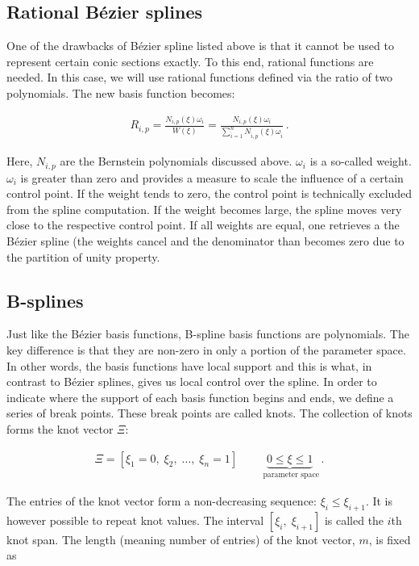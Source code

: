 \documentclass[11pt,a4paper]{article}
\begin{document}
\subsection{Rational Bézier splines}

One of the drawbacks of Bézier spline listed above is that it cannot be used to represent certain conic sections exactly. To this end, rational functions are needed. In this case, we will use rational functions defined via the ratio of two polynomials. The new basis function becomes:

\begin{align}
R_{i,p}=\frac{N_{i,p}(\xi)\omega_{i}}{W(\xi)}=\frac{N_{i,p}(\xi)\omega_{i}}{\sum_{\hat{i}=1}^{n}N_{\hat{i},p}(\xi)\omega_{\hat{i}}} \,.
\end{align}

Here, $N_{i,p}$ are the Bernstein polynomials discussed above. $\omega_i$ is a so-called weight. $\omega_i$ is greater than zero and provides a measure to scale the influence of a certain control point. If the weight tends to zero, the control point is technically excluded from the spline computation. If the weight becomes large, the spline moves very close to the respective control point. If all weights are equal, one retrieves a the Bézier spline (the weights cancel and the denominator than becomes zero due to the partition of unity property.

\subsection{B-splines}

Just like the Bézier basis functions, B-spline basis functions are polynomials. The key difference is that they are non-zero in only a portion of the parameter space. In other words, the basis functions have local support and this is what, in contrast to Bézier splines, gives us local control over the spline. In order to indicate where the support of each basis function begins and ends, we define a series of break points. These break points are called knots. The collection of knots forms the knot vector $\Xi$:

\begin{align}
\Xi=[\xi_{1}=0,\;\xi_{2},\;\dots,\;\xi_{n}=1]\qquad \underbrace{0\le\xi\le 1}_{\text{ parameter space}} \,.
\end{align}

The entries of the knot vector form a non-decreasing sequence: $\xi_{i}\le\xi_{i+1}$. It is however possible to repeat knot values. The interval $[\xi_{i},\;\xi_{i+1}]$ is called the $i$th knot span. The length (meaning number of entries) of the knot vector, $m$, is fixed as
\end{document}
